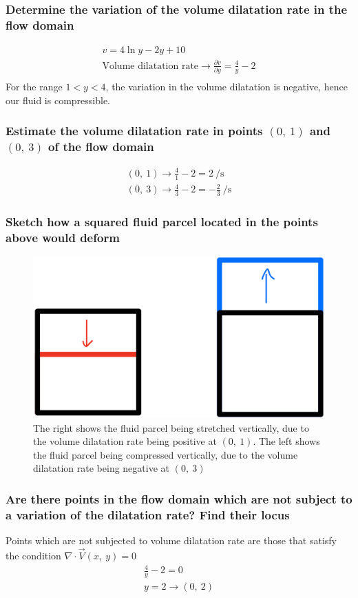 \documentclass[class=report, crop=false, 12pt,a4paper]{standalone}
\begin{document}
\subsubsection{Determine the variation of the volume dilatation rate in the flow domain}
\begin{gather}
  v = 4\ln{y} - 2y + 10\\
  \textrm{Volume dilatation rate} \rightarrow \frac{\partial v}{\partial y} = \frac{4}{y} - 2\\
\end{gather}
For the range $1 < y < 4$, the variation in the volume dilatation is negative, hence our fluid is compressible. 
\subsubsection{Estimate the volume dilatation rate in points $(0, \ 1)$ and $(0, \ 3)$ of the flow domain}
\begin{gather}
  (0, \ 1) \rightarrow \frac{4}{1} - 2 = 2 \ \si{\per\second}\\
  (0, \ 3) \rightarrow \frac{4}{3} - 2 = -\frac{2}{3} \ \si{\per\second}
\end{gather}
\subsubsection{Sketch how a squared fluid parcel located in the points above would deform}
\begin{figure}
  \centering
  \includegraphics[width = 0.8 \textwidth]{../img/fluidparcelcompression.png}
  \caption{The right shows the fluid parcel being stretched vertically, due to the volume dilatation rate being positive at $(0, \ 1)$. The left shows the fluid parcel being compressed vertically, due to the volume dilatation rate being negative at $(0, \ 3)$}
\end{figure}
\subsubsection{Are there points in the flow domain which are not subject to a variation of the dilatation rate? Find their locus}
Points which are not subjected to volume dilatation rate are those that satisfy the condition $\nabla \cdot \vec{V}(x, \ y) = 0$
\begin{gather}
  \frac{4}{y}-2 = 0\\
  y = 2 \rightarrow (0, \ 2)
\end{gather}
\end{document}
